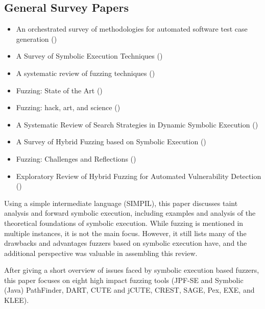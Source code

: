 \documentclass{article}
\begin{document}
\begin{multicols}{2}
    \subsection{General Survey Papers}
    \begin{itemize}
        \item    An orchestrated survey of methodologies for automated software test case generation ()\cite{Orchestrated}
        \item    A Survey of Symbolic Execution Techniques ()\cite{SurveySymbex}
        \item    A systematic review of fuzzing techniques ()\cite{Science}
        \item    Fuzzing: State of the Art ()\cite{FuzzingStateOfTheArt2018}
        \item    Fuzzing: hack, art, and science ()\cite{HackArtScience}
        \item    A Systematic Review of Search Strategies in Dynamic Symbolic Execution ()\cite{SearchStrategies}
        \item    A Survey of Hybrid Fuzzing based on Symbolic Execution ()\cite{SurveyHybrid}
        \item    Fuzzing: Challenges and Reflections ()\cite{ChallengesAndReflections}
        \item    Exploratory Review of Hybrid Fuzzing for Automated Vulnerability Detection ()\cite{Hybrid}
    \end{itemize}

    Using a simple intermediate language (SIMPIL), this paper discusses taint analysis and forward symbolic execution, including examples and analysis of the theoretical foundations of symbolic execution. While fuzzing is mentioned in multiple instances, it is not the main focus. However, it still lists many of the drawbacks and advantages fuzzers based on symbolic execution have, and the additional perspective was valuable in assembling this review.

    After giving a short overview of issues faced by symbolic execution based fuzzers, this paper focuses on eight high impact fuzzing tools (JPF-SE and Symbolic (Java) PathFinder\cite{JPFSE, JavaPathFinder}, DART\cite{DART}, CUTE\cite{CUTE} and jCUTE\cite{ExplicitPathModelChecking}, CREST\cite{CREST}, SAGE\cite{SAGE}, Pex\cite{Pex}, EXE\cite{EXE}, and KLEE\cite{KLEE}).


\end{multicols}
\end{document}
